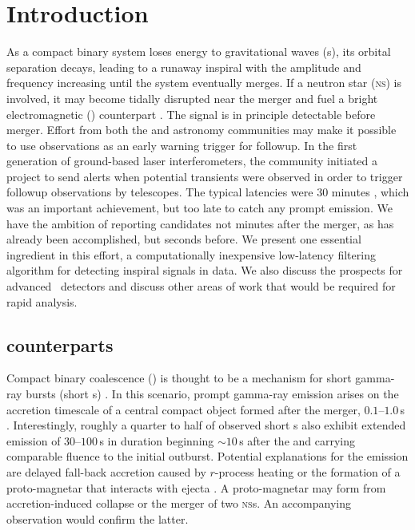 \section{Introduction}
\label{sec:introduction}

As a compact binary system loses energy to gravitational waves (\GW{}s), its
orbital separation decays, leading to a runaway inspiral with the \GW{}
amplitude and frequency increasing until the system eventually merges.
If a neutron star (\textsc{ns}) is involved, it may become tidally disrupted near
the merger and fuel a bright electromagnetic (\EM{}) counterpart
\citep{shibata:2007}.  The \GW{} signal is in principle detectable
before merger.  Effort from both the \GW{} and astronomy communities may make
it possible to use \GW{} observations as an early warning trigger for \EM{}
followup. In the first generation of ground-based laser interferometers, the \GW{}
community initiated a project to send alerts when potential \GW{} transients
were observed in order to trigger followup observations by \EM{} telescopes.
The typical latencies were 30 minutes \citep{HugheyGWPAW2011}, which was an
important achievement, but too late to catch any prompt \EM{}
emission. We have the ambition of reporting \GW{} candidates not minutes after
the merger, as has already been accomplished, but seconds before.  We present
one essential ingredient in this effort, a computationally inexpensive
low-latency filtering algorithm for detecting inspiral signals in \GW{}
data.  We also discuss the prospects for advanced \GW\ detectors and
discuss other areas of work that would be required for rapid analysis.

\subsection{\EM{} counterparts}

Compact binary coalescence (\CBC) is thought to be a
mechanism for short gamma-ray bursts (short \GRB{}s) \citep{Lee:2005, nakar07}.
In this scenario, prompt gamma-ray emission arises on the accretion timescale
of a central compact object formed after the merger, $0.1$--$1.0$\,s
\citep{Janka1999}.  Interestingly, roughly a quarter to half of observed short
\GRB{}s also exhibit extended emission of $30$--$100$\,s in duration beginning
$\sim$$10$\,s after the \GRB{} and carrying comparable fluence to the initial
outburst.  Potential explanations for the emission are delayed fall-back
accretion caused by $r$-process heating \citep{Metzger2010} or the formation of
a proto-magnetar that interacts with
ejecta \citep{Bucciantini2011}.  A proto-magnetar may
form from accretion-induced collapse or the merger of two \textsc{ns}s.  An
accompanying \GW{} observation would confirm the latter.

